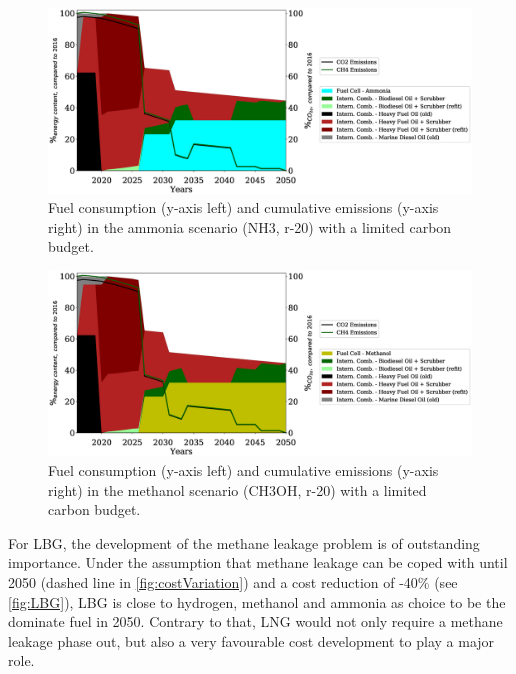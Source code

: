 \documentclass[article]{elsarticle}
\begin{document}
\begin{figure}
    \centering
    \includegraphics[width=\textwidth]{figures/NH3_fuels_emissions.eps}
    \caption{Fuel consumption (y-axis left) and cumulative emissions (y-axis right) in the ammonia scenario (NH3, r-20) with a limited carbon budget.}
    \label{fig:Ammonia}
\end{figure}

\begin{figure}
    \centering
    \includegraphics[width=\textwidth]{figures/CH3OH_fuels_emissions.eps}
    \caption{Fuel consumption (y-axis left) and cumulative emissions (y-axis right) in the methanol scenario (CH3OH, r-20) with a limited carbon budget.}
    \label{fig:Methanol}
\end{figure}

For LBG, the development of the methane leakage problem is of outstanding importance. Under the assumption that methane leakage can be coped with until 2050 (dashed line in \autoref{fig:costVariation}) and a cost reduction of -40\% (see \autoref{fig:LBG}), LBG is close to hydrogen, methanol and ammonia as choice to be the dominate fuel in 2050. Contrary to that, LNG would not only require a methane leakage phase out, but also a very favourable cost development to play a major role.
\end{document}
